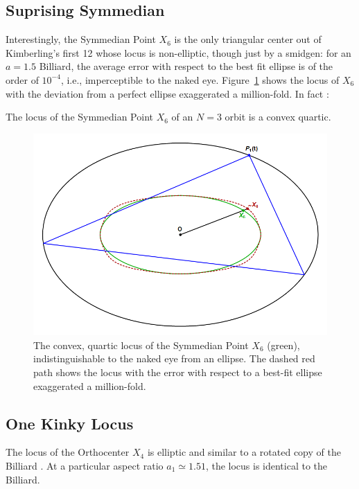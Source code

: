 \subsection{Suprising Symmedian}

Interestingly, the Symmedian Point $X_6$ is the only triangular center out of Kimberling's first 12 whose locus is non-elliptic, though just by a smidgen: for an $a=1.5$ Billiard, the average error with respect to the best fit ellipse is of the order of $10^{-4}$, i.e., imperceptible to the naked eye. Figure~\ref{fig:symmedian} shows the locus of $X_6$ with the deviation from a perfect ellipse exaggerated a million-fold. In fact \cite{ronaldo19a}:

\begin{observation}
The locus of the Symmedian Point $X_6$ of an $N=3$ orbit is a convex quartic.
\end{observation}

\begin{figure}[H]
    \centering
    \includegraphics[width=.75\textwidth]{pics/0041_symmedian.png}
    \caption{The convex, quartic locus of the Symmedian Point $X_6$ (green), indistinguishable to the naked eye from an ellipse. The dashed red path shows the locus with the error with respect to a best-fit ellipse exaggerated a million-fold.}
    \label{fig:symmedian}
\end{figure}

\subsection{One Kinky Locus}

The locus of the Orthocenter $X_4$ is elliptic and similar to a rotated copy of the Billiard \cite{ronaldo19a}. At a particular aspect ratio $a_1\simeq{1.51}$, the locus is identical to the Billiard.


